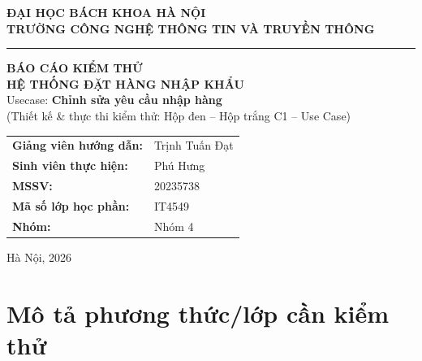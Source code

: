 \documentclass[12pt,a4paper]{article}
\newcommand{\svName}{Phú Hưng}          %
\newcommand{\svMSSV}{20235738}
\newcommand{\svGVHD}{Trịnh Tuấn Đạt}
\newcommand{\svHP}{IT4549}
\newcommand{\svNhom}{Nhóm 4}
\begin{document}
\begin{titlepage}
\centering
\thispagestyle{empty}

{\large \textbf{ĐẠI HỌC BÁCH KHOA HÀ NỘI}}\\[2pt]
{\large \textbf{TRƯỜNG CÔNG NGHỆ THÔNG TIN VÀ TRUYỀN THÔNG}}\\[6pt]
\rule{\textwidth}{0.8pt}

\vspace{1.2cm}

\vspace{0.8cm}
{\Huge \textbf{BÁO CÁO KIỂM THỬ}}\\[10pt]
{\LARGE \textbf{HỆ THỐNG ĐẶT HÀNG NHẬP KHẨU}}\\[18pt]
{\Large Usecase: \textbf{Chỉnh sửa yêu cầu nhập hàng}}\\[6pt]
{\large (Thiết kế \& thực thi kiểm thử: Hộp đen -- Hộp trắng C1 -- Use Case)}

\vspace{1.6cm}
\begin{flushleft}\large
\hspace{1.5cm}
\begin{tabular}{@{}ll@{}}
\textbf{Giảng viên hướng dẫn:} & \svGVHD \\[8pt]
\textbf{Sinh viên thực hiện:}  & \svName \\[8pt]
\textbf{MSSV:}                 & \svMSSV \\[8pt]
\textbf{Mã số lớp học phần:}   & \svHP \\[8pt]
\textbf{Nhóm:}                 & \svNhom \\
\end{tabular}
\end{flushleft}

\vfill
{\large Hà Nội, 2026}
\end{titlepage}

\tableofcontents
\thispagestyle{empty}
\newpage
\setcounter{page}{1}

\section{Mô tả phương thức/lớp cần kiểm thử}
\end{document}
